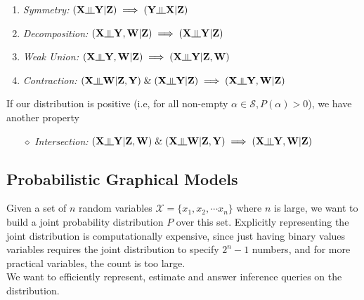\begin{enumerate}
	\item \textit{Symmetry:} $(\mathbf X \ind \mathbf Y|\mathbf Z) \implies (\mathbf Y \ind \mathbf X|\mathbf Z)$
	\item \textit{Decomposition:} $(\mathbf X \ind \mathbf{Y, W}|\mathbf Z) \implies (\mathbf X \ind \mathbf Y|\mathbf{Z})$
	\item \textit{Weak Union:} $(\mathbf X \ind \mathbf Y, \mathbf W|\mathbf Z) \implies (\mathbf X \ind \mathbf Y|\mathbf Z,  \mathbf W)$
	\item \textit{Contraction:} $(\mathbf X \ind \mathbf W|\mathbf Z, \mathbf Y)\; \& \;(\mathbf X \ind \mathbf Y|\mathbf Z) \implies (\mathbf X \ind \mathbf Y, \mathbf W|\mathbf Z)$
\end{enumerate}
If our distribution is positive (i.e, for all non-empty $\alpha \in \mathcal S, P(\alpha) > 0$), we have another property
\begin{itemize}[leftmargin=1cm]
	\item[$\diamond$] \textit{Intersection:}  $(\mathbf X \ind \mathbf Y|\mathbf Z, \mathbf W)\; \& \;(\mathbf X \ind \mathbf W|\mathbf Z, \mathbf Y) \implies (\mathbf X \ind \mathbf Y, \mathbf W|\mathbf Z)$
\end{itemize}

\subsection{Probabilistic Graphical Models}
Given a set of $n$ random variables $\mathcal{X} = \{x_1, x_2, \cdots x_n\}$ where $n$ is large, we want to build a joint probability distribution $P$ over this set. Explicitly representing the joint distribution is computationally expensive, since just having binary values variables requires the joint distribution to specify $2^n-1$ numbers, and for more practical variables, the count is too large. \\
We want to efficiently represent, estimate and answer inference queries on the distribution.
